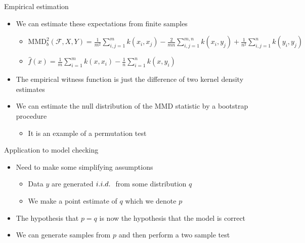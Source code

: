 \begin{frame}{Empirical estimation}
  \begin{itemize}
    \item We can estimate these expectations from finite samples
    \begin{itemize}
      \item $\textrm{MMD}_b^2(\mathcal{F},X,Y) = \frac{1}{m^2}\sum_{i,j=1}^{m}k(x_i,x_j) - \frac{2}{mn}\sum_{i,j=1}^{m,n}k(x_i,y_j) + \frac{1}{n^2}\sum_{i,j=1}^{n}k(y_i,y_j)$
      \item $\hat{f}(x) = \frac{1}{m}\sum_{i=1}^{m}k(x,x_i) - \frac{1}{n}\sum_{i=1}^{n}k(x,y_i)$
    \end{itemize}
    \vspace{\baselineskip}
    \pause
    \item The empirical witness function is just the difference of two kernel density estimates
    \vspace{\baselineskip}
    \pause
    \item We can estimate the null distribution of the MMD statistic by a bootstrap procedure
    \begin{itemize}
      \item It is an example of a permutation test
    \end{itemize}
  \end{itemize}
\end{frame}

\begin{frame}{Application to model checking}
  \begin{itemize}
    \item Need to make some simplifying assumptions
    \begin{itemize}
      \item Data $y$ are generated $i.i.d.\ $ from some distribution $q$
      \item We make a point estimate of $q$ which we denote $p$
    \end{itemize}
    \vspace{\baselineskip}
    \pause
    \item The hypothesis that $p = q$ is now the hypothesis that the model is correct
    \vspace{\baselineskip}
    \pause
    \item We can generate samples from $p$ and then perform a two sample test
  \end{itemize}
\end{frame}

